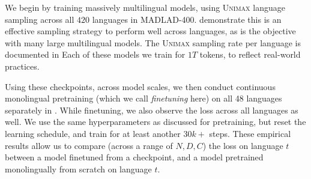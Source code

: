 We begin by training massively multilingual models, using \textsc{Unimax} \citep{chung2023unimax} language sampling across all $420$ languages in MADLAD-400.
\citet{chung2023unimax} demonstrate this is an effective sampling strategy to perform well across languages, as is the objective with many large multilingual models.
The \textsc{Unimax} sampling rate per language is documented in 
Each of these models we train for $1T$ tokens, to reflect real-world practices.

Using these \unimax{} checkpoints, across model scales, we then conduct continuous monolingual pretraining (which we call \emph{finetuning} here) on all 48 languages separately in \Leval.
While finetuning, we also observe the loss across all \Leval languages as well. We use the same hyperparameters as discussed for pretraining, but reset the learning schedule, and train for at least another $30k+$ steps.
These empirical results allow us to compare (across a range of $N,D,C$) the loss on language $t$ between a model finetuned from a \unimax{} checkpoint, and a model pretrained monolingually from scratch on language $t$.